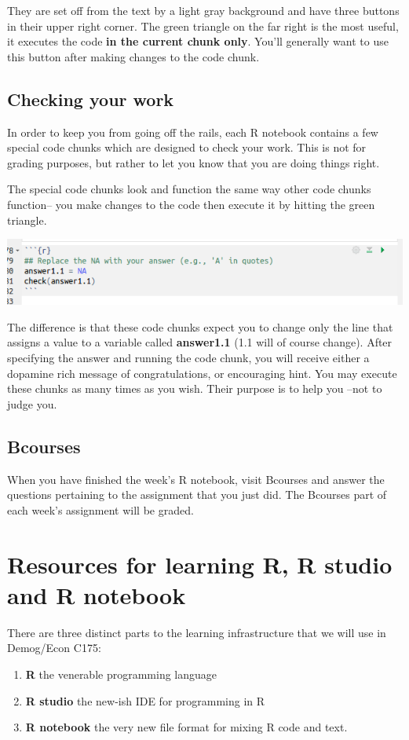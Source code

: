 \documentclass[11pt]{article}
\begin{document}
They are set off from the text by a light gray background and have three buttons in their upper right corner.  The green triangle on the far right is the most useful, it executes the code \textbf{in the current chunk only}. You'll generally want to use this button after making changes to the code chunk.

\subsection{Checking your work}

In order to keep you from going off the rails, each R notebook contains a few special code chunks which are designed to check your work. This is not for grading purposes, but rather to let you know that you are doing things right.

The special code chunks look and function the same way other code chunks function-- you make changes to the code then execute it by hitting the green triangle.

\includegraphics[scale=.5]{RstudioCheck}

The difference is that these code chunks expect you to change only the line that assigns a value to a variable called \textbf{answer1.1} (1.1 will of course change).  After specifying the answer and running the code chunk, you will receive either a dopamine rich message of congratulations, or encouraging hint.  You may execute these chunks as many times as you wish. Their purpose is to help you --not to judge you.

\subsection{Bcourses}

When you have finished the week's R notebook, visit Bcourses and answer the questions pertaining to the assignment that you just did.  The Bcourses part of each week's assignment will be graded.

\section{Resources for learning R, R studio and R notebook}

There are three distinct parts to the learning infrastructure that we will use in Demog/Econ C175: 
\begin{enumerate}
\item \textbf{R} the venerable programming language
\item \textbf{R studio} the new-ish IDE for programming in R
\item \textbf{R notebook} the very new file format for mixing R code and text.
\end{enumerate}
\end{document}
